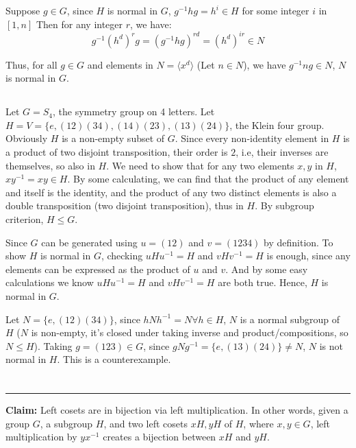 \documentclass[12pt]{article}
\begin{document}
Suppose $g\in G$, since $H$ is normal in $G$, $g^{-1}hg=h^{i}\in H$ for some integer $i$ in $[1,n]$ Then for any integer $r$, we have:
$$g^{-1}(h^{d})^rg=(g^{-1}hg)^{rd}=(h^d)^{ir}\in N$$

Thus, for all $g\in G$ and elements in $N=\langle x^d\rangle$ (Let $n\in N$), we have $g^{-1}ng\in N$, $N$ is normal in $G$. 
\subsection{}
Let $G=S_4$, the symmetry group on 4 letters. Let $H=V=\{e,(12)(34),(14)(23),(13)(24)\}$, the Klein four group. Obviously $H$ is a non-empty subset of $G$. Since every non-identity element in $H$ is a product of two disjoint transposition, their order is $2$, i.e, their inverses are themselves, so also in $H$. We need to show that for any two elements $x,y$ in $H$, $xy^{-1}=xy\in H$. By some calculating, we can find that the product of any element and itself is the identity, and the product of any two distinct elements is also a double transposition (two disjoint transposition), thus in $H$. By subgroup criterion, $H\le G$.

Since $G$ can be generated using $u=(12)$ and $v=(1234)$ by definition. To show $H$ is normal in $G$, checking $uHu^{-1}=H$ and $vHv^{-1}=H$ is enough, since any elements can be expressed as the product of $u$ and $v$. And by some easy calculations we know $uHu^{-1}=H$ and $vHv^{-1}=H$ are both true. Hence, $H$ is normal in $G$.

Let $N=\{e, (12)(34)\}$, since $hNh^{-1}=N\forall h\in H$, $N$ is a normal subgroup of $H$ ($N$ is non-empty, it's closed under taking inverse and product/compositions, so $N\le H$). Taking $g=(123)\in G$, since $gNg^{-1}=\{e,(13)(24)\}\ne N$, $N$ is not normal in $H$. This is a counterexample.
\newpage
\section{} %

\noindent\rule{\textwidth}{1pt}

\textbf{Claim: } Left cosets are in bijection via left multiplication. In other words, given a group $G$, a subgroup $H$, and two left cosets $xH, yH$ of $H$, where $x,y\in G$, left multiplication by $yx^{-1}$ creates a bijection between $xH$ and $yH$.
\end{document}
